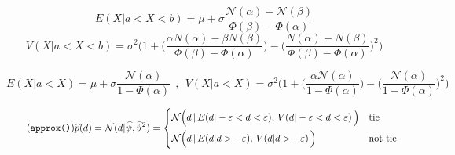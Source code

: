 \documentclass[a4paper,10pt]{book}
\newcommand{\N}{\mathcal{N}}
\theoremstyle{definition}
\newif\ifen
\newif\ifes
\newcommand{\en}[1]{\ifen#1\fi}
\newcommand{\es}[1]{\ifes#1\fi}
\begin{document}
%
\en{It is known that the exponential family, to which the Gaussian distribution belongs, minimizes the Kullback-Leibler divergence with respect to the true distribution $p$, $KL(p||q)$ when both have the same moments~\cite{Minka2005}. }%
\es{Se sabe que la familia exponencial, a la que pertenece la distribuci\'on gaussianas, minimizan la divergencia Kullback-Leibler respecto de la verdadera distribuci\'on $p$, $KL(p||q)$, cuando ambas tienen mismos momentos~\cite{Minka2005}. }%
%
\en{The expectation and variance of a truncated Gaussian $\N(x|\mu,\sigma^2)$ in the range from $a$ to $b$ are:}
\es{La esperanza y la varianza de una gaussiana truncada $\N(x|\mu,\sigma^2)$ en un intervalo $[a,b]$ son,}
%
\begin{equation}\label{eq:mean_aprox_double}
 E(X| a < X < b) = \mu + \sigma \frac{\N(\alpha) - \N(\beta) }{\Phi(\beta) - \Phi(\alpha) }
\end{equation}
%
\begin{equation}\label{eq:variance_aprox_double}
 V(X| a < X < b) = \sigma^2 \Bigg( 1 + \bigg(\frac{\alpha N(\alpha) - \beta N(\beta) }{\Phi(\beta) - \Phi(\alpha) }\bigg) - \bigg(\frac{N(\alpha) - N(\beta) }{\Phi(\beta) - \Phi(\alpha) }\bigg)^2 \Bigg)
\end{equation}
%
\en{where $\beta = \frac{b-\mu}{\sigma}$ and $\alpha = \frac{a-\mu}{\sigma}$. }%
\es{donde $\beta = \frac{b-\mu}{\sigma}$ y $\alpha = \frac{a-\mu}{\sigma}$. }%
%
\en{With a single-sided truncation, they can be simplified as:}
\es{Con un \'unico truncamiento, se pueden simplificar como,}
%
\begin{equation*}
 E(X| a < X )   =  \mu + \sigma \frac{\N(\alpha)}{1 - \Phi(\alpha) } \ \ , \ \ V(X| a < X )  = \sigma^2 \Bigg( 1 + \bigg(\frac{\alpha \N(\alpha)}{1 - \Phi(\alpha) }\bigg) - \bigg(\frac{\N(\alpha)}{1 - \Phi(\alpha) }\bigg)^2 \Bigg) 
\end{equation*}
%
\en{Then, the Gaussian that best approximates $p(d)$ is:}
\es{Luego, la gaussiana que mejor aproxima a $p(d)$ es}
%
\begin{equation}\label{eq:p*_d} \tag{\texttt{approx()}}
 \widehat{p}(d) = \N(d | \widehat{\psi}, \widehat{\vartheta}^2) =
 \begin{cases*}
 \N\Big(d \,  | \, E(d | -\varepsilon < d < \varepsilon ) , \,  V(d | -\varepsilon < d < \varepsilon ) \, \Big) & \text{tie} \\
\N\Big(d \,  | \, E(d | d > -\varepsilon ) , \,  V(d | d > -\varepsilon ) \, \Big) & \text{not tie}
  \end{cases*}
\end{equation}
\end{document}
